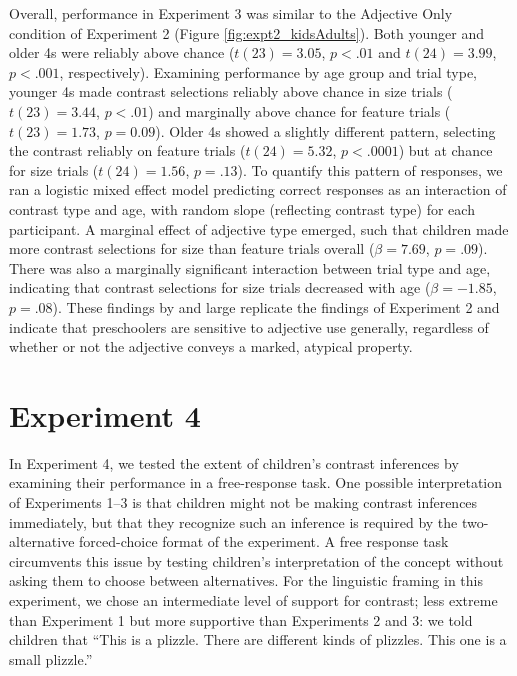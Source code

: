 \documentclass[man]{apa2}
\begin{document}
Overall, performance in Experiment 3 was similar to the Adjective Only condition of Experiment 2 (Figure \ref{fig:expt2_kidsAdults}). 
Both younger and older 4s were reliably above chance ($t(23) = 3.05$, $p<.01$ and $t(24) = 3.99$, $p<.001$, respectively). Examining performance by age group and trial type, younger 4s made contrast selections reliably above chance in size trials ($t(23)=3.44$, $p<.01$) and marginally above chance for feature trials ($t(23)=1.73$, $p=0.09$). Older 4s showed a slightly different pattern, selecting the contrast reliably on feature trials ($t(24)=5.32$, $p<.0001$) but at chance for size trials ($t(24)=1.56$, $p=.13$). To quantify this pattern of responses, we ran a logistic mixed effect model predicting correct responses as an interaction of contrast type and age, with random slope (reflecting contrast type) for each participant.  A marginal effect of adjective type emerged, such that children made more contrast selections for size than feature trials overall ($\beta = 7.69$, $p = .09$). There was also a marginally significant interaction between trial type and age, indicating that contrast selections for size trials decreased with age ($\beta = -1.85$, $p = .08$). These findings by and large replicate the findings of Experiment 2 and indicate that preschoolers are sensitive to adjective use generally, regardless of whether or not the adjective conveys a marked, atypical property.

\section{Experiment 4} 

In Experiment 4, we tested the extent of children's contrast inferences by examining their performance in a free-response task. One possible interpretation of Experiments 1--3 is that children might not be making  contrast inferences immediately, but that they recognize such an inference is required by the two-alternative forced-choice format of the experiment. A free response task circumvents this issue by testing children's interpretation of the concept without asking them to choose between alternatives. For the linguistic framing in this experiment, we chose an intermediate level of support for contrast; less extreme than Experiment 1 but more supportive than Experiments 2 and 3: we told children that ``This is a plizzle. There are different kinds of plizzles. This one is a small plizzle.'' 
\end{document}
